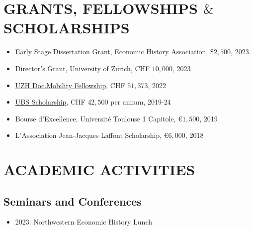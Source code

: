 \documentclass[letterpaper]{article}
\begin{document}

\section*{\MakeUppercase{grants, Fellowships $\&$ scholarships}}
\begin{itemize}
	\item Early Stage Dissertation Grant, Economic History Association, \$$2,500$, 2023
    \item Director's Grant, University of Zurich, CHF $10,000$, 2023
    \item \href{https://www.research.uzh.ch/en/funding/phd/uzh-doc-mobility.html}{UZH Doc.Mobility Fellowship}, CHF $51,373$, 2022
    \item \href{https://www.ubscenter.uzh.ch/en/scholarships.html}{UBS Scholarship}, CHF $42,500$ per annum, 2019-24
    \item Bourse d'Excellence, Université Toulouse 1 Capitole, \euro $1,500$, 2019
    \item L’Association Jean-Jacques Laffont Scholarship, \euro $6,000$, 2018
\end{itemize}

\section*{\MakeUppercase{academic activities}}

\subsection*{Seminars and Conferences}
\begin{itemize}
    \item 2023: Northwestern Economic History Lunch
\end{itemize}
\end{document}
